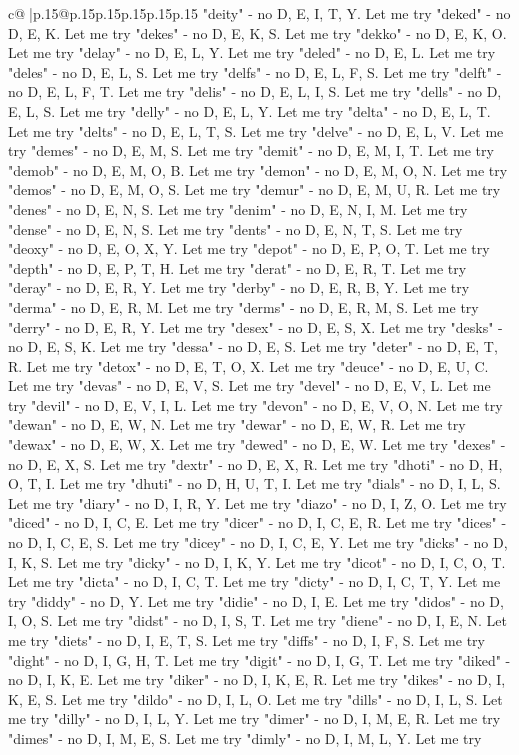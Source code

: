 \documentclass{article}
\begin{document}
{\begin{supertabular}{c@{$\;$}|p{.15\linewidth}@{}p{.15\linewidth}p{.15\linewidth}p{.15\linewidth}p{.15\linewidth}p{.15\linewidth}}
{{{"deity" {-} no D, E, I, T, Y. Let me try "deked" {-} no D, E, K. Let me try "dekes" {-} no D, E, K, S. Let me try "dekko" {-} no D, E, K, O. Let me try "delay" {-} no D, E, L, Y. Let me try "deled" {-} no D, E, L. Let me try "deles" {-} no D, E, L, S. Let me try "delfs" {-} no D, E, L, F, S. Let me try "delft" {-} no D, E, L, F, T. Let me try "delis" {-} no D, E, L, I, S. Let me try "dells" {-} no D, E, L, S. Let me try "delly" {-} no D, E, L, Y. Let me try "delta" {-} no D, E, L, T. Let me try "delts" {-} no D, E, L, T, S. Let me try "delve" {-} no D, E, L, V. Let me try "demes" {-} no D, E, M, S. Let me try "demit" {-} no D, E, M, I, T. Let me try "demob" {-} no D, E, M, O, B. Let me try "demon" {-} no D, E, M, O, N. Let me try "demos" {-} no D, E, M, O, S. Let me try "demur" {-} no D, E, M, U, R. Let me try "denes" {-} no D, E, N, S. Let me try "denim" {-} no D, E, N, I, M. Let me try "dense" {-} no D, E, N, S. Let me try "dents" {-} no D, E, N, T, S. Let me try "deoxy" {-} no D, E, O, X, Y. Let me try "depot" {-} no D, E, P, O, T. Let me try "depth" {-} no D, E, P, T, H. Let me try "derat" {-} no D, E, R, T. Let me try "deray" {-} no D, E, R, Y. Let me try "derby" {-} no D, E, R, B, Y. Let me try "derma" {-} no D, E, R, M. Let me try "derms" {-} no D, E, R, M, S. Let me try "derry" {-} no D, E, R, Y. Let me try "desex" {-} no D, E, S, X. Let me try "desks" {-} no D, E, S, K. Let me try "dessa" {-} no D, E, S. Let me try "deter" {-} no D, E, T, R. Let me try "detox" {-} no D, E, T, O, X. Let me try "deuce" {-} no D, E, U, C. Let me try "devas" {-} no D, E, V, S. Let me try "devel" {-} no D, E, V, L. Let me try "devil" {-} no D, E, V, I, L. Let me try "devon" {-} no D, E, V, O, N. Let me try "dewan" {-} no D, E, W, N. Let me try "dewar" {-} no D, E, W, R. Let me try "dewax" {-} no D, E, W, X. Let me try "dewed" {-} no D, E, W. Let me try "dexes" {-} no D, E, X, S. Let me try "dextr" {-} no D, E, X, R. Let me try "dhoti" {-} no D, H, O, T, I. Let me try "dhuti" {-} no D, H, U, T, I. Let me try "dials" {-} no D, I, L, S. Let me try "diary" {-} no D, I, R, Y. Let me try "diazo" {-} no D, I, Z, O. Let me try "diced" {-} no D, I, C, E. Let me try "dicer" {-} no D, I, C, E, R. Let me try "dices" {-} no D, I, C, E, S. Let me try "dicey" {-} no D, I, C, E, Y. Let me try "dicks" {-} no D, I, K, S. Let me try "dicky" {-} no D, I, K, Y. Let me try "dicot" {-} no D, I, C, O, T. Let me try "dicta" {-} no D, I, C, T. Let me try "dicty" {-} no D, I, C, T, Y. Let me try "diddy" {-} no D, Y. Let me try "didie" {-} no D, I, E. Let me try "didos" {-} no D, I, O, S. Let me try "didst" {-} no D, I, S, T. Let me try "diene" {-} no D, I, E, N. Let me try "diets" {-} no D, I, E, T, S. Let me try "diffs" {-} no D, I, F, S. Let me try "dight" {-} no D, I, G, H, T. Let me try "digit" {-} no D, I, G, T. Let me try "diked" {-} no D, I, K, E. Let me try "diker" {-} no D, I, K, E, R. Let me try "dikes" {-} no D, I, K, E, S. Let me try "dildo" {-} no D, I, L, O. Let me try "dills" {-} no D, I, L, S. Let me try "dilly" {-} no D, I, L, Y. Let me try "dimer" {-} no D, I, M, E, R. Let me try "dimes" {-} no D, I, M, E, S. Let me try "dimly" {-} no D, I, M, L, Y. Let me try }}}
\end{supertabular}}
\end{document}
